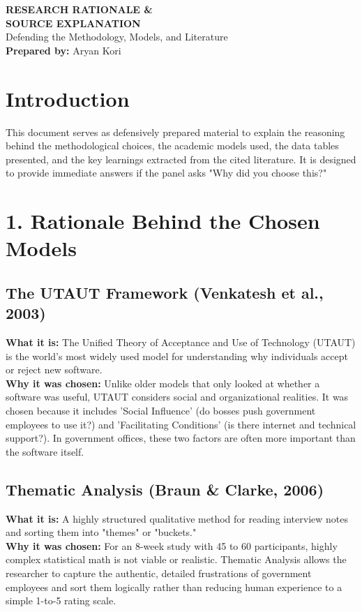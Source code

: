 \documentclass[11pt,a4paper]{article}
\begin{document}
\begin{center}
    \vspace*{1cm}
    \Huge\color{navyblue}\textbf{RESEARCH RATIONALE \&} \\[0.2em]
    \Huge\color{navyblue}\textbf{SOURCE EXPLANATION} \\[0.5em]
    \large\color{gray}Defending the Methodology, Models, and Literature \\[0.2cm]
    \normalsize\color{gold}\textbf{Prepared by:} Aryan Kori
    \vspace{1cm}
\end{center}

\section*{Introduction}
This document serves as defensively prepared material to explain the reasoning behind the methodological choices, the academic models used, the data tables presented, and the key learnings extracted from the cited literature. It is designed to provide immediate answers if the panel asks "Why did you choose this?"

\vspace{0.5cm}

\section*{1. Rationale Behind the Chosen Models}

\subsection*{The UTAUT Framework (Venkatesh et al., 2003)}
\textbf{What it is:} The Unified Theory of Acceptance and Use of Technology (UTAUT) is the world's most widely used model for understanding why individuals accept or reject new software. \\
\textbf{Why it was chosen:} Unlike older models that only looked at whether a software was useful, UTAUT considers social and organizational realities. It was chosen because it includes 'Social Influence' (do bosses push government employees to use it?) and 'Facilitating Conditions' (is there internet and technical support?). In government offices, these two factors are often more important than the software itself.

\subsection*{Thematic Analysis (Braun \& Clarke, 2006)}
\textbf{What it is:} A highly structured qualitative method for reading interview notes and sorting them into "themes" or "buckets." \\
\textbf{Why it was chosen:} For an 8-week study with 45 to 60 participants, highly complex statistical math is not viable or realistic. Thematic Analysis allows the researcher to capture the authentic, detailed frustrations of government employees and sort them logically rather than reducing human experience to a simple 1-to-5 rating scale. 
\end{document}
